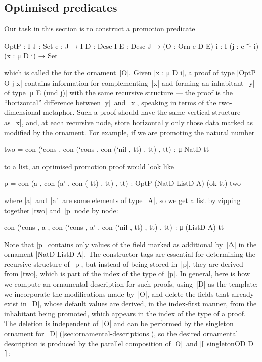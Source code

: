 \subsection{Optimised predicates}
\label{sec:optimised-predicates}

Our task in this section is to construct a promotion predicate
\begin{spec}
OptP :  {I J : Set} {e : J → I} {D : Desc I} {E : Desc J} →
        (O : Orn e D E) {i : I} (j : e ⁻¹ i) (x : μ D i) → Set
\end{spec}
which is called the  for the ornament~|O|.
Given |x : μ D i|, a proof of type |OptP O j x| contains information for complementing~|x| and forming an inhabitant~|y| of type |μ E (und j)| with the same recursive structure --- the proof is the ``horizontal'' difference between |y|~and~|x|, speaking in terms of the two-dimensional metaphor.
Such a proof should have the same vertical structure as~|x|, and, at each recursive node, store horizontally only those data marked as modified by the ornament.
For example, if we are promoting the natural number
\begin{code}
two =  con (`cons  ,
       con (`cons  ,
       con (`nil   ,
         tt) , tt) , tt) : μ NatD tt
\end{code}
to a list, an optimised promotion proof would look like
\begin{code}
p =  con (a   ,
     con (a'  ,
     con (
       tt) , tt) , tt) : OptP (NatD-ListD A) (ok tt) two
\end{code}
where |a|~and~|a'| are some elements of type~|A|, so we get a list by zipping together |two| and~|p| node by node:
\begin{code}
con (`cons  , a   ,
con (`cons  , a'  ,
con (`nil   ,
  tt) , tt) , tt) : μ (ListD A) tt
\end{code}
Note that |p|~contains only values of the field marked as additional by~|Δ| in the ornament |NatD-ListD A|.
The constructor tags are essential for determining the recursive structure of~|p|, but instead of being stored in~|p|, they are derived from |two|, which is part of the index of the type of~|p|.
In general, here is how we compute an ornamental description for such proofs, using~|D| as the template:
we incorporate the modifications made by~|O|, and delete the fields that already exist in~|D|, whose default values are derived, in the index-first manner, from the inhabitant being promoted, which appears in the index of the type of a proof.
The deletion is independent of~|O| and can be performed by the singleton ornament for~|D| (\autoref{sec:ornamental-descriptions}), so the desired ornamental description is produced by the parallel composition of |O|~and |⌈ singletonOD D ⌉|:
